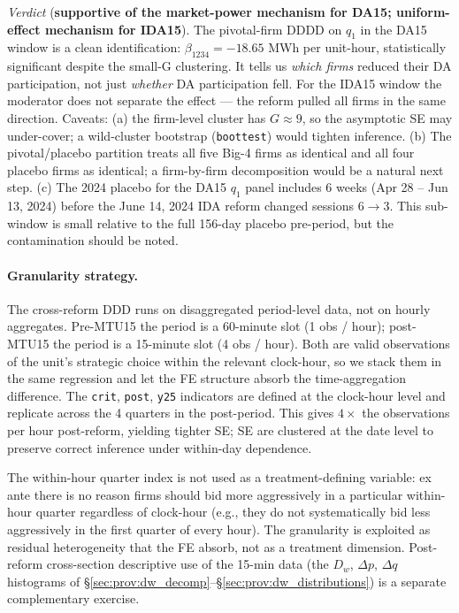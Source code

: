 \documentclass[11pt,a4paper]{article}
\newcommand{\code}[1]{\nolinkurl{#1}}
\begin{document}
\textit{Verdict} (\textbf{supportive of the market-power mechanism for DA15; uniform-effect mechanism for IDA15}). The pivotal-firm DDDD on $q_1$ in the DA15 window is a clean identification: $\beta_{1234} = -18.65$ MWh per unit-hour, statistically significant despite the small-G clustering. It tells us \emph{which firms} reduced their DA participation, not just \emph{whether} DA participation fell. For the IDA15 window the moderator does not separate the effect — the reform pulled all firms in the same direction. Caveats: (a) the firm-level cluster has $G \approx 9$, so the asymptotic SE may under-cover; a wild-cluster bootstrap (\code{boottest}) would tighten inference. (b) The pivotal/placebo partition treats all five Big-4 firms as identical and all four placebo firms as identical; a firm-by-firm decomposition would be a natural next step. (c) The 2024 placebo for the DA15 $q_1$ panel includes 6 weeks (Apr 28 -- Jun 13, 2024) before the June 14, 2024 IDA reform changed sessions 6$\to$3. This sub-window is small relative to the full 156-day placebo pre-period, but the contamination should be noted.






\paragraph{Granularity strategy.}
The cross-reform DDD runs on disaggregated period-level data, not on hourly aggregates. Pre-MTU15 the period is a 60-minute slot (1 obs / hour); post-MTU15 the period is a 15-minute slot (4 obs / hour). Both are valid observations of the unit's strategic choice within the relevant clock-hour, so we stack them in the same regression and let the FE structure absorb the time-aggregation difference. The \texttt{crit}, \texttt{post}, \texttt{y25} indicators are defined at the clock-hour level and replicate across the 4 quarters in the post-period. This gives $4\times$ the observations per hour post-reform, yielding tighter SE; SE are clustered at the date level to preserve correct inference under within-day dependence.

The within-hour quarter index is not used as a treatment-defining variable: ex ante there is no reason firms should bid more aggressively in a particular within-hour quarter regardless of clock-hour (e.g., they do not systematically bid less aggressively in the first quarter of every hour). The granularity is exploited as residual heterogeneity that the FE absorb, not as a treatment dimension. Post-reform cross-section descriptive use of the 15-min data (the $D_w$, $\Delta p$, $\Delta q$ histograms of \S\ref{sec:prov:dw_decomp}--\S\ref{sec:prov:dw_distributions}) is a separate complementary exercise.
\end{document}
